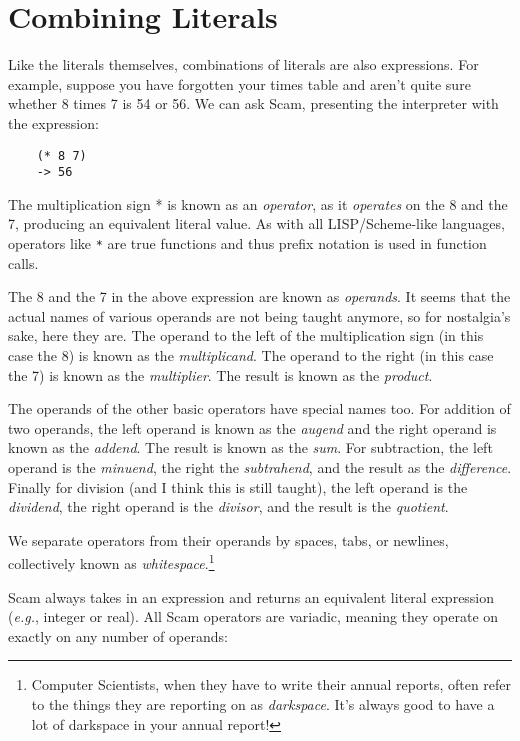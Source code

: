 \chapter{Combining Literals}
\label{CombiningLiterals}

Like the literals themselves, combinations of literals are also
expressions. For example, suppose you have forgotten your times table
and aren't quite sure whether 8 times 7 is 54 or 56. We can ask Scam,
presenting the interpreter with the expression:

\begin{verbatim}
    (* 8 7)
    -> 56
\end{verbatim}

The
multiplication sign * is known as an {\it operator}, as it {\it operates} on the 8
and the 7, producing an equivalent literal value.
As with all LISP/Scheme-like languages, operators like \verb!*!
are true functions and thus prefix notation is used in function calls.

The 8 and the 7 in the above expression are
known as {\it operands}. It seems that the actual names of various operands are
not being taught anymore, so for nostalgia's sake, here they are. The
operand to the left of the multiplication sign (in this case the 8) is
known as the {\it multiplicand}. The operand to the right (in this case the 7)
is known as the {\it multiplier}. The result is known as the {\it product}.

The operands of the other basic operators
have special names too. For addition of two operands, the left operand is known as the
{\it augend} and the right operand is known as the {\it addend}.
The result is known as the {\it sum}.
For subtraction,
the left operand is the {\it minuend}, the right the {\it subtrahend}, and
the result as the {\it difference}.
Finally
for division (and I think this is still taught), the left operand is
the {\it dividend}, the right operand is the {\it divisor}, and the 
result is the {\it quotient}.

We separate
operators from their operands by
spaces, tabs,
or newlines, collectively known as {\it whitespace}.\footnote{
Computer Scientists, when they have to write their annual reports,
often refer to the things they are reporting on as
{\it darkspace}. It's always good to have a lot of darkspace in
your annual report!
}

Scam always takes in an expression and returns an equivalent
literal expression ({\it e.g.}, integer or real). All Scam operators are
variadic, meaning they operate on exactly on any number of operands:

